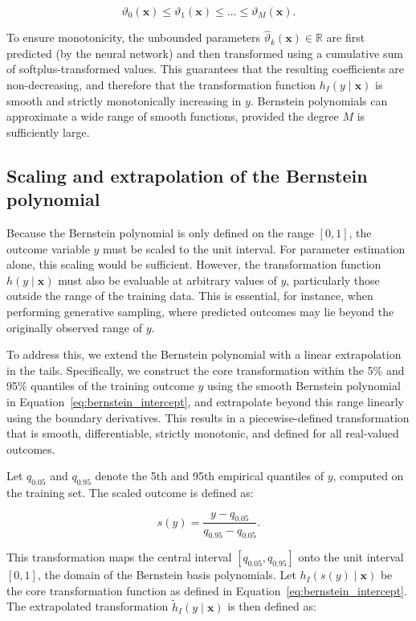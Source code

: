 \[
\vartheta_0(\mathbf{x}) \leq \vartheta_1(\mathbf{x}) \leq \dots \leq \vartheta_M(\mathbf{x}).
\]

To ensure monotonicity, the unbounded parameters $\hat{\vartheta}_k(\mathbf{x}) \in \mathbb{R}$ are first predicted (by the neural network) and then transformed using a cumulative sum of softplus-transformed values. This guarantees that the resulting coefficients are non-decreasing, and therefore that the transformation function $h_I(y \mid \mathbf{x})$ is smooth and strictly monotonically increasing in $y$.
Bernstein polynomials can approximate a wide range of smooth functions, provided the degree $M$ is sufficiently large.



\subsection{Scaling and extrapolation of the Bernstein polynomial}

Because the Bernstein polynomial is only defined on the range $[0, 1]$, the outcome variable $y$ must be scaled to the unit interval. For parameter estimation alone, this scaling would be sufficient. However, the transformation function $h(y \mid \mathbf{x})$ must also be evaluable at arbitrary values of $y$, particularly those outside the range of the training data. This is essential, for instance, when performing generative sampling, where predicted outcomes may lie beyond the originally observed range of $y$.

To address this, we extend the Bernstein polynomial with a linear extrapolation in the tails. Specifically, we construct the core transformation within the 5\% and 95\% quantiles of the training outcome $y$ using the smooth Bernstein polynomial in Equation~\ref{eq:bernstein_intercept}, and extrapolate beyond this range linearly using the boundary derivatives. This results in a piecewise-defined transformation that is smooth, differentiable, strictly monotonic, and defined for all real-valued outcomes.

Let $q_{0.05}$ and $q_{0.95}$ denote the 5th and 95th empirical quantiles of $y$, computed on the training set. The scaled outcome is defined as:

\begin{equation}
s(y) = \frac{y - q_{0.05}}{q_{0.95} - q_{0.05}}.
\end{equation}

This transformation maps the central interval $[q_{0.05}, q_{0.95}]$ onto the unit interval $[0, 1]$, the domain of the Bernstein basis polynomials. Let $h_I(s(y) \mid \mathbf{x})$ be the core transformation function as defined in Equation~\eqref{eq:bernstein_intercept}. The extrapolated transformation $\tilde{h}_I(y \mid \mathbf{x})$ is then defined as:

